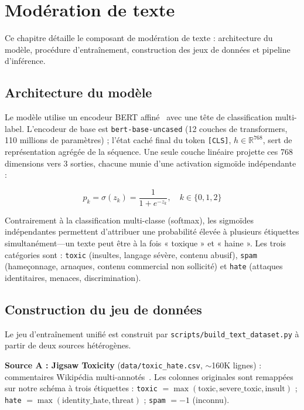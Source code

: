 \chapter{Modération de texte}
\label{ch:text_moderation}

Ce chapitre détaille le composant de modération de texte : architecture du modèle, procédure d'entraînement, construction des jeux de données et pipeline d'inférence.

\section{Architecture du modèle}

Le modèle utilise un encodeur BERT affiné~\cite{devlin2019bert} avec une tête de classification multi-label. L'encodeur de base est \texttt{bert-base-uncased} (12 couches de transformers, 110 millions de paramètres) ; l'état caché final du token \texttt{[CLS]}, $h \in \mathbb{R}^{768}$, sert de représentation agrégée de la séquence. Une seule couche linéaire projette ces 768 dimensions vers 3 sorties, chacune munie d'une activation sigmoïde indépendante :

\begin{equation}
p_k = \sigma(z_k) = \frac{1}{1 + e^{-z_k}}, \quad k \in \{0, 1, 2\}
\end{equation}

Contrairement à la classification multi-classe (softmax), les sigmoïdes indépendantes permettent d'attribuer une probabilité élevée à plusieurs étiquettes simultanément---un texte peut être à la fois « toxique » et « haine ». Les trois catégories sont : \texttt{toxic} (insultes, langage sévère, contenu abusif), \texttt{spam} (hameçonnage, arnaques, contenu commercial non sollicité) et \texttt{hate} (attaques identitaires, menaces, discrimination).

\section{Construction du jeu de données}

Le jeu d'entraînement unifié est construit par \texttt{scripts/build\_text\_dataset.py} à partir de deux sources hétérogènes.

\textbf{Source A : Jigsaw Toxicity} (\texttt{data/toxic\_hate.csv}, $\sim$160K lignes) : commentaires Wikipédia multi-annotés~\cite{dbpedia2014}. Les colonnes originales sont remappées sur notre schéma à trois étiquettes : \texttt{toxic} $= \max(\text{toxic}, \text{severe\_toxic}, \text{insult})$ ; \texttt{hate} $= \max(\text{identity\_hate}, \text{threat})$ ; \texttt{spam} $= -1$ (inconnu).

